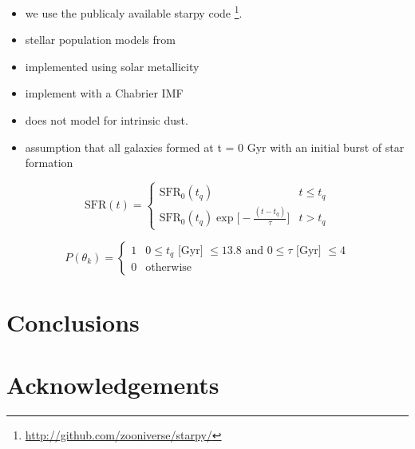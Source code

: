\documentclass[a4paper,fleqn,usenatbib]{mnras}
\begin{document}
   \begin{itemize}
    
      \item we use the publicaly available starpy code \footnote{\url{http://github.com/zooniverse/starpy/}}.
      \item  stellar population models from \cite{bruzual2003}
  
      \item implemented using solar metallicity

      \item implement with a Chabrier IMF \cite{chabrier2003}

      \item does not model for intrinsic dust.

      \item  assumption that all galaxies formed at t = 0 Gyr with 
             an initial burst of star formation
   \end{itemize}
 
   \begin{equation}
      \text{SFR}(t) = \begin{cases}
                \text{SFR}_{0}(t_{q}) & t \leq t_{q} \\
                \text{SFR}_{0}(t_{q})\exp\bigg[-\frac{(t-t_{q})}{\tau}\bigg] & t > t_{q} 
               \end{cases}
       \label{eq:model}
   \end{equation}



   

   \begin{equation}
      P(\theta_{k}) = \begin{cases}
                       1 & 0\leq t_{q}\text{ [Gyr] } \leq 13.8 \text{ and }  0 \leq \tau\text{ [Gyr] } \leq 4 \\
                       0 & \text{otherwise}
                      \end{cases}
      \label{eq:prior}
   \end{equation}

\section{Conclusions}

\section*{Acknowledgements}










\appendix




\bsp	%
\label{lastpage}
\end{document}

